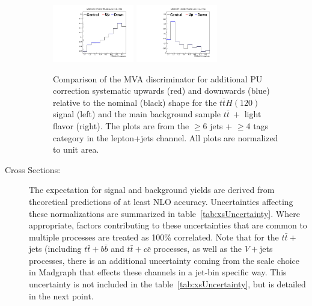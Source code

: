 \begin{description}
\begin{figure}[hbtp]
 \begin{center}
   \includegraphics[width=0.35\textwidth]{Figures/Analysis_1_Diagrams/SystPlot_rwt_ttH120_ljets_jge6_tge4.pdf}
   \includegraphics[width=0.35\textwidth]{Figures/Analysis_1_Diagrams/SystPlot_rwt_ttbar_ljets_jge6_tge4.pdf}
  \caption{Comparison of the MVA discriminator for  additional PU correction systematic upwards
     (red) and downwards (blue) relative to the nominal (black) shape
     for the $t\bar{t}H(120)$ signal (left) and the main background sample
     $t\bar{t}\ +$ light flavor (right).  The plots are from the
     $\ge$6 jets + $\ge$4 tags category in the lepton+jets channel.
     All plots are normalized to unit area.}\label{fig:addPUCorr}
 \end{center}
\end{figure}

  \item[Cross Sections:] The expectation for signal and background
    yields are derived from theoretical predictions of at least NLO
    accuracy.  Uncertainties affecting these normalizations are
    summarized in table~\ref{tab:xsUncertainty}.  Where appropriate,
    factors contributing to these uncertainties that are common to
    multiple processes are treated as 100\% correlated.  Note that for
    the $t\bar{t}+$jets (including $t\bar{t}+b\bar{b}$ and
    $t\bar{t}+c\bar{c}$ processes, as well as the $V+$jets processes,
    there is an additional uncertainty coming from the scale choice in
    Madgraph that effects these channels in a jet-bin specific way.
    This uncertainty is not included in the
    table~\ref{tab:xsUncertainty}, but is detailed in the next point.  


\end{description}
